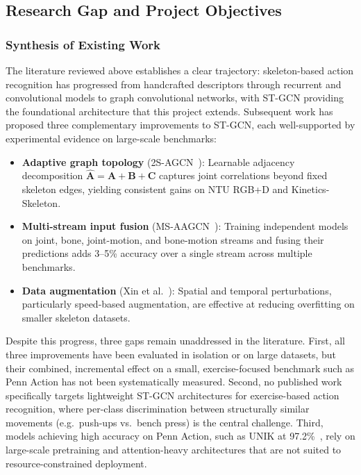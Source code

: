 \subsection{Research Gap and Project Objectives}

\subsubsection*{Synthesis of Existing Work}
The literature reviewed above establishes a clear trajectory: skeleton-based action recognition has progressed from handcrafted descriptors through recurrent and convolutional models to graph convolutional networks, with ST-GCN providing the foundational architecture that this project extends. Subsequent work has proposed three complementary improvements to ST-GCN, each well-supported by experimental evidence on large-scale benchmarks:

\begin{itemize}
    \item \textbf{Adaptive graph topology} (2S-AGCN~\cite{shi2019two}): Learnable adjacency decomposition $\hat{\mathbf{A}} = \mathbf{A} + \mathbf{B} + \mathbf{C}$ captures joint correlations beyond fixed skeleton edges, yielding consistent gains on NTU RGB+D and Kinetics-Skeleton.
    \item \textbf{Multi-stream input fusion} (MS-AAGCN~\cite{shi2020skeleton}): Training independent models on joint, bone, joint-motion, and bone-motion streams and fusing their predictions adds 3--5\% accuracy over a single stream across multiple benchmarks.
    \item \textbf{Data augmentation} (Xin et al.~\cite{xin2024enhancing}): Spatial and temporal perturbations, particularly speed-based augmentation, are effective at reducing overfitting on smaller skeleton datasets.
\end{itemize}

Despite this progress, three gaps remain unaddressed in the literature. First, all three improvements have been evaluated in isolation or on large datasets, but their combined, incremental effect on a small, exercise-focused benchmark such as Penn Action has not been systematically measured. Second, no published work specifically targets lightweight ST-GCN architectures for exercise-based action recognition, where per-class discrimination between structurally similar movements (e.g.\ push-ups vs.\ bench press) is the central challenge. Third, models achieving high accuracy on Penn Action, such as UNIK at 97.2\%~\cite{yang2021unik}, rely on large-scale pretraining and attention-heavy architectures that are not suited to resource-constrained deployment.

